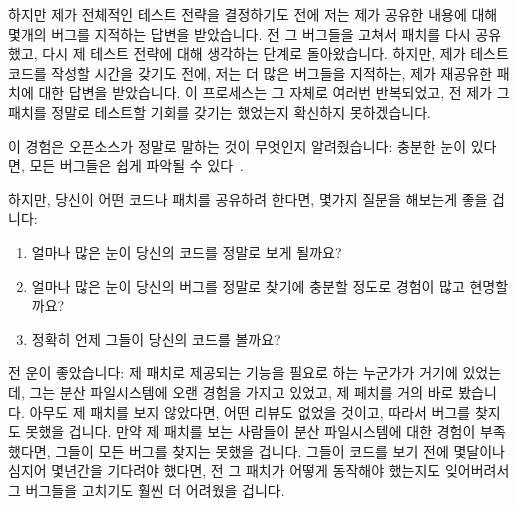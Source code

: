 하지만 제가 전체적인 테스트 전략을 결정하기도 전에 저는 제가 공유한 내용에 대해
몇개의 버그를 지적하는 답변을 받았습니다.
전 그 버그들을 고쳐서 패치를 다시 공유했고, 다시 제 테스트 전략에 대해 생각하는
단계로 돌아왔습니다.
하지만, 제가 테스트 코드를 작성할 시간을 갖기도 전에, 저는 더 많은 버그들을
지적하는, 제가 재공유한 패치에 대한 답변을 받았습니다.
이 프로세스는 그 자체로 여러번 반복되었고, 전 제가 그 패치를 정말로 테스트할
기회를 갖기는 했었는지 확신하지 못하겠습니다.

이 경험은 오픈소스가 정말로 말하는 것이 무엇인지 알려줬습니다:
충분한 눈이 있다면, 모든 버그들은 쉽게 파악될 수 있다~\cite{EricSRaymond99b}.

하지만, 당신이 어떤 코드나 패치를 공유하려 한다면, 몇가지 질문을 해보는게 좋을
겁니다:

\begin{enumerate}
\item	얼마나 많은 눈이 당신의 코드를 정말로 보게 될까요?
\item	얼마나 많은 눈이 당신의 버그를 정말로 찾기에 충분할 정도로 경험이 많고
	현명할까요?
\item	정확히 언제 그들이 당신의 코드를 볼까요?

\end{enumerate}

전 운이 좋았습니다:  제 패치로 제공되는 기능을 필요로 하는 누군가가 거기에
있었는데, 그는 분산 파일시스템에 오랜 경험을 가지고 있었고, 제 페치를 거의
바로 봤습니다.
아무도 제 패치를 보지 않았다면, 어떤 리뷰도 없었을 것이고, 따라서 버그를 찾지도
못했을 겁니다.
만약 제 패치를 보는 사람들이 분산 파일시스템에 대한 경험이 부족했다면, 그들이
모든 버그를 찾지는 못했을 겁니다.
그들이 코드를 보기 전에 몇달이나 심지어 몇년간을 기다려야 했다면, 전 그 패치가
어떻게 동작해야 했는지도 잊어버려서 그 버그들을 고치기도 훨씬 더 어려웠을
겁니다.
\iffalse

